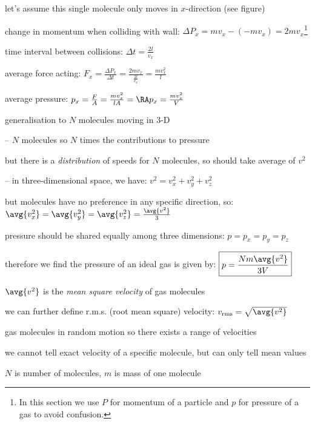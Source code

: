 let's assume this single molecule only moves in $x$-direction (see figure)

change in momentum when colliding with wall: $\Delta P_x = mv_x - (-mv_x) = 2mv_x$\footnote{In this section we use $P$ for momentum of a particle and $p$ for pressure of a gas to avoid confusion.}

time interval between collisions: $\Delta t=\frac{2l}{v_x}$

average force acting: $F_x=\frac{\Delta P_x}{\Delta t} = \frac{2mv_x}{\tfrac{2l}{v_x}} = \frac{mv_x^2}{l}$

average pressure: $p_x=\frac{F}{A} = \frac{mv_x^2}{lA} = \RA p_x = \frac{mv_x^2}{V}$

\vspace*{\baselineskip}

generalisation to $N$ molecules moving in 3-D

\begin{compactitem}
	\item[--] $N$ molecules so $N$ times the contributions to pressure
	
	but there is a \emph{distribution} of speeds for $N$ molecules, so should take average of $v^2$
	
	\item[--] in three-dimensional space, we have: $v^2=v_x^2 + v_y^2 + v_z^2$
	
	but molecules have no preference in any specific direction, so: $\avg{v_x^2} = \avg{v_y^2} = \avg{v_z^2} = \frac{\avg{v^2}}{3}$
	
	pressure should be shared equally among three dimensions: $p=p_x=p_y=p_z$
		
\end{compactitem}

\vspace*{\baselineskip}

therefore we find the pressure of an ideal gas is given by: $\boxed{p = \frac{Nm\avg{v^2}}{3V}}$

\cmt $\avg{v^2}$ is the \emph{mean square velocity} of gas molecules

we can further define r.m.s. (root mean square) velocity: $v_\text{rms} = \sqrt{\avg{v^2}}$ 

gas molecules in random motion so there exists a range of velocities

we cannot tell exact velocity of a specific molecule, but can only tell mean values

\cmt $N$ is number of molecules, $m$ is mass of one molecule


